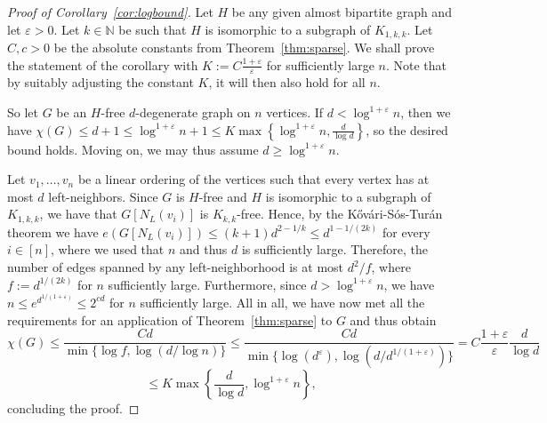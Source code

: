 \documentclass[10pt]{amsart}
\theoremstyle{definition}
\begin{document}
\begin{proof}[Proof of Corollary~\ref{cor:logbound}]
Let $H$ be any given almost bipartite graph and let $\varepsilon>0$. Let $k\in \mathbb{N}$ be such that $H$ is isomorphic to a subgraph of $K_{1,k,k}$. Let $C,c>0$ be the absolute constants from Theorem~\ref{thm:sparse}. We shall prove the statement of the corollary with $K:=C\frac{1+\varepsilon}{\varepsilon}$ for sufficiently large $n$. Note that by suitably adjusting the constant $K$, it will then also hold for all $n$.

So let $G$ be an $H$-free $d$-degenerate graph on $n$ vertices. If $d<\log^{1+\varepsilon} n$, then we have $\chi(G)\le d+1\le \log^{1+\varepsilon}n+1\le K\max\left\{\log^{1+\varepsilon}n, \frac{d}{\log d}\right\}$, so the desired bound holds. Moving on, we may thus assume $d\ge \log^{1+\varepsilon} n$. 

Let $v_1,\ldots,v_n$ be a linear ordering of the vertices such that every vertex has at most $d$ left-neighbors. Since $G$ is $H$-free and $H$ is isomorphic to a subgraph of $K_{1,k,k}$, we have that $G[N_L(v_i)]$ is $K_{k,k}$-free. Hence, by the K\H{o}v\'{a}ri-S\'{o}s-Tur\'{a}n theorem we have $e(G[N_L(v_i)])\le (k+1)d^{2-1/k}\le d^{1-1/(2k)}$ for every $i\in [n]$, where we used that $n$ and thus $d$ is sufficiently large. Therefore, the number of edges spanned by any left-neighborhood is at most $d^2/f$, where $f:=d^{1/(2k)}$ for $n$ sufficiently large. Furthermore, since $d>\log^{1+\varepsilon}n$, we have $n\le e^{d^{1/(1+\varepsilon)}}\le 2^{cd}$ for $n$ sufficiently large. All in all, we have now met all the requirements for an application of Theorem~\ref{thm:sparse} to $G$ and thus obtain
$$\chi(G)\le \frac{Cd}{\min\{\log f,\log(d/\log n)\}}\le \frac{Cd}{\min\{\log( d^\varepsilon),\log(d/d^{1/(1+\varepsilon)})\}}=C\frac{1+\varepsilon}{\varepsilon}\frac{d}{\log d}$$ $$\le K\max\left\{\frac{d}{\log d},\log^{1+\varepsilon}n\right\},$$ concluding the proof.
\end{proof}
\end{document}
